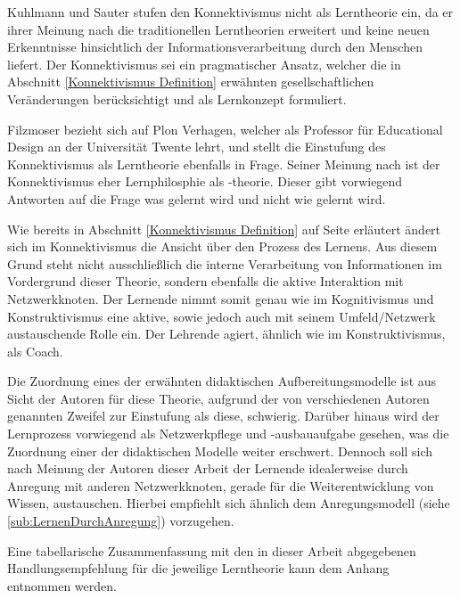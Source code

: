 Kuhlmann und Sauter stufen den Konnektivismus nicht als Lerntheorie ein, da er ihrer Meinung nach die traditionellen Lerntheorien erweitert und keine neuen Erkenntnisse hinsichtlich der Informationsverarbeitung durch den Menschen liefert. Der Konnektivismus sei ein pragmatischer Ansatz, welcher die in Abschnitt \ref{Konnektivismus Definition} erwähnten gesellschaftlichen Veränderungen berücksichtigt und als Lernkonzept formuliert.\cite[S. 50]{Kuhlmann.2008} 

Filzmoser bezieht sich auf Plon Verhagen, welcher als Professor für Educational Design an der Universität Twente lehrt, und stellt die Einstufung des Konnektivismus als Lerntheorie ebenfalls in Frage. Seiner Meinung nach ist der Konnektivismus eher Lernphilosphie als -theorie. Dieser gibt vorwiegend Antworten auf die Frage was gelernt wird und nicht wie gelernt wird.\cite[S. 26]{Filzmoser.2013}

Wie bereits in Abschnitt \ref{Konnektivismus Definition} auf Seite \pageref{RolleLernender} erläutert ändert sich im Konnektivismus die Ansicht über den Prozess des Lernens. Aus diesem Grund steht nicht ausschließlich die interne Verarbeitung von Informationen im Vordergrund dieser Theorie, sondern ebenfalls die aktive Interaktion mit Netzwerkknoten. Der Lernende nimmt somit genau wie im Kognitivismus und Konstruktivismus eine aktive, sowie jedoch auch mit seinem Umfeld/Netzwerk austauschende Rolle ein. Der Lehrende agiert, ähnlich wie im Konstruktivismus, als Coach. 

Die Zuordnung eines der erwähnten didaktischen Aufbereitungsmodelle ist aus Sicht der Autoren für diese Theorie, aufgrund der von verschiedenen Autoren genannten Zweifel zur Einstufung als diese, schwierig. Darüber hinaus wird der Lernprozess vorwiegend als Netzwerkpflege und -ausbauaufgabe gesehen, was die Zuordnung einer der didaktischen Modelle weiter erschwert. Dennoch soll sich nach Meinung der Autoren dieser Arbeit der Lernende idealerweise durch Anregung mit anderen Netzwerkknoten, gerade für die Weiterentwicklung von Wissen, austauschen. Hierbei empfiehlt sich ähnlich dem Anregungsmodell (siehe \ref{sub:LernenDurchAnregung}) vorzugehen.

Eine tabellarische Zusammenfassung mit den in dieser Arbeit abgegebenen Handlungsempfehlung für die jeweilige Lerntheorie kann dem Anhang entnommen werden. 


 